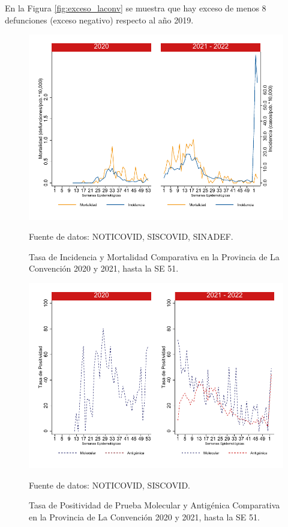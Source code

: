 \documentclass[12pt,a4paper,openany]{book}
\begin{document}
	En la Figura \ref{fig:exceso_laconv} se muestra que hay exceso de menos 8 defunciones (exceso negativo) respecto al año 2019.
		
		\begin{figure}[h]
			\caption{Tasa de Incidencia y Mortalidad Comparativa en la Provincia de La Convención 2020 y 2021, hasta la SE 51.}\label{fig:inc_mort_laconv}
			\begin{center}
				\includegraphics[width=0.7\linewidth]{../figuras/incidencia_mortalidad_20_21_9}
			\end{center}
			{\footnotesize {Fuente de datos: NOTICOVID, SISCOVID, SINADEF.}}
		\end{figure}
		
		\begin{figure}[h]
			\caption{Tasa de Positividad de Prueba Molecular y Antigénica Comparativa en la Provincia de La Convención 2020 y 2021, hasta la SE 51.}\label{fig:positividad_laconv}
			\begin{center}
				\includegraphics[width=0.7\linewidth]{../figuras/positividad_20_21_9}
			\end{center}
			{\footnotesize {Fuente de datos: NOTICOVID, SISCOVID.}}
		\end{figure}
		
\end{document}
